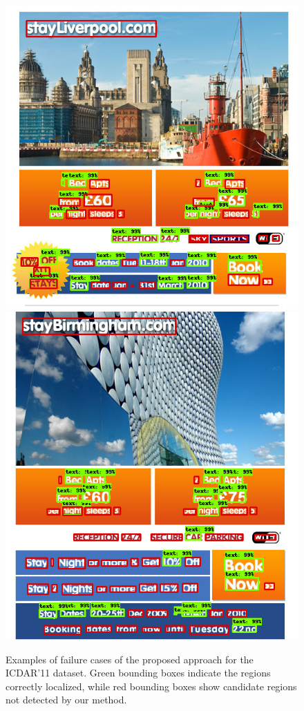 \begin{figure}[!h]
    \includegraphics[height=0.25\textheight]{VISAPP/figs/qualitative-results/icdar11/32m.png}
    \includegraphics[height=0.25\textheight]{VISAPP/figs/qualitative-results/icdar11/10m.png}

\caption{Examples of failure cases of the proposed approach for the ICDAR'11 dataset. Green bounding boxes indicate the regions correctly localized, while red bounding boxes show candidate regions not detected by our method.}
	\label{fig:qualitative-results-bad-11}
\end{figure}

